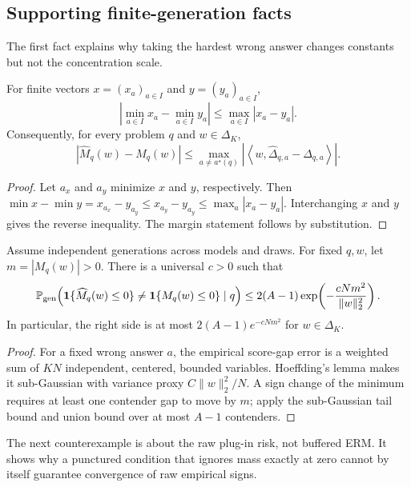 \subsection{Supporting finite-generation facts}
\label{app:legacy-support}

The first fact explains why taking the hardest wrong answer changes constants
but not the concentration scale.

\begin{lemma}
\label{lem:legacy-min-stability}
For finite vectors \(x=(x_a)_{a\in I}\) and \(y=(y_a)_{a\in I}\),
\[
\left|\min_{a\in I}x_a-\min_{a\in I}y_a\right|
\le \max_{a\in I}|x_a-y_a|.
\]
Consequently, for every problem \(q\) and \(w\in\Delta_K\),
\[
|\widehat M_q(w)-M_q(w)|
\le
\max_{a\ne a^\star(q)}
\left|\left\langle
w,\widehat\Delta_{q,a}-\Delta_{q,a}
\right\rangle\right|.
\]
\end{lemma}

\begin{proof}
Let \(a_x\) and \(a_y\) minimize \(x\) and \(y\), respectively.  Then
\(\min x-\min y=x_{a_x}-y_{a_y}\le x_{a_y}-y_{a_y}\le
\max_a|x_a-y_a|\).  Interchanging \(x\) and \(y\) gives the reverse
inequality.  The margin statement follows by substitution.
\end{proof}

\begin{lemma}
\label{lem:legacy-sign}
Assume independent generations across models and draws.  For fixed \(q,w\), let
\(m=|M_q(w)|>0\).  There is a universal \(c>0\) such that
\[
\mathbb P_{\rm gen}\!\left(
\mathbf 1\{\widehat M_q(w)\le0\}\ne
\mathbf 1\{M_q(w)\le0\}\mid q
\right)
\le
2(A-1)\exp\!\left(
-\frac{cNm^2}{\|w\|_2^2}
\right).
\]
In particular, the right side is at most
\(2(A-1)e^{-cNm^2}\) for \(w\in\Delta_K\).
\end{lemma}

\begin{proof}
For a fixed wrong answer \(a\), the empirical score-gap error is a weighted
sum of \(KN\) independent, centered, bounded variables.  Hoeffding's lemma
makes it sub-Gaussian with variance proxy \(C\|w\|_2^2/N\).  A sign change of
the minimum requires at least one contender gap to move by \(m\); apply the
sub-Gaussian tail bound and union bound over at most \(A-1\) contenders.
\end{proof}

The next counterexample is about the raw plug-in risk, not buffered ERM.  It
shows why a punctured condition that ignores mass exactly at zero cannot by
itself guarantee convergence of raw empirical signs.

